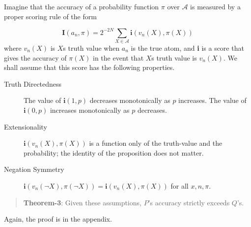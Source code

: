 Imagine that the accuracy of a probability function $\pi$ over $\mathscr{A}$ is measured by a proper scoring rule of the form

$$\mathbf{I}(a_n, \pi) = 2^{-2N}\sum_{X \in \mathscr{A}} \mathbf{i}(v_n(X), \pi(X))$$
where $v_n(X)$ is $X$s truth value when $a_n$ is the true atom, and \textbf{i} is a score that gives the accuracy of $\pi(X)$ in the event that $X$s truth value is $v_n(X)$. We shall assume that this score has the following properties.

\begin{description}

\item[Truth Directedness]

The value of $\mathbf{i}(1, p)$ decreases monotonically as $p$ increases. The value of $\mathbf{i}(0, p)$ increases monotonically as $p$ decreases.

\item[Extensionality]

$\mathbf{i}(v_n(X), \pi(X))$ is a function only of the truth-value and the probability; the identity of the proposition does not matter.

\item[Negation Symmetry]

$\mathbf{i}(v_n(\neg X), \pi(\neg X)) = \mathbf{i}(v_n(X), \pi(X))$ for all $x, n, \pi$.
\end{description}

\begin{quote}

\textbf{Theorem-3}: Given these assumptions, $P$'s accuracy strictly exceeds $Q$'s.
\end{quote}
Again, the proof is in the appendix.

